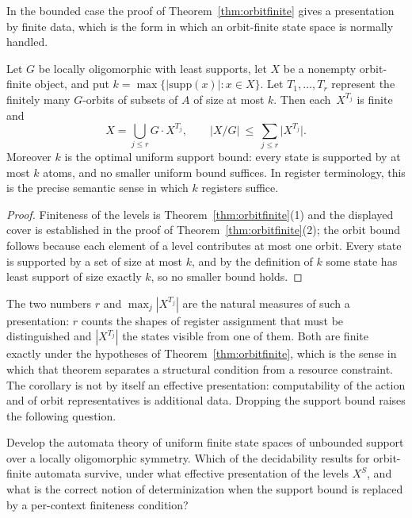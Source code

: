 \documentclass{lmcs}
\newcommand{\supp}{\mathrm{supp}}
\begin{document}
In the bounded case the proof of Theorem~\ref{thm:orbitfinite} gives a
presentation by finite data, which is the form in which an orbit-finite
state space is normally handled.

\begin{cor}\label{cor:presentation}
Let $G$ be locally oligomorphic with least supports, let $X$ be a
nonempty orbit-finite object, and put
$k=\max\{|\supp(x)|:x\in X\}$. Let
$T_1,\dots,T_r$ represent the finitely many $G$-orbits of subsets of
$A$ of size at most $k$. Then each~$X^{T_j}$ is finite and
\[
   X=\bigcup_{j\leq r}G\cdot X^{T_j},
   \qquad
   |X/G|\ \leq\ \sum_{j\leq r}\bigl|X^{T_j}\bigr|.
\]
Moreover $k$ is the optimal uniform support bound: every state is
supported by at most $k$ atoms, and no smaller uniform bound suffices.
In register terminology, this is the precise semantic sense in which
$k$ registers suffice.
\end{cor}

\begin{proof}
Finiteness of the levels is Theorem~\ref{thm:orbitfinite}(1) and the
displayed cover is established in the proof of
Theorem~\ref{thm:orbitfinite}(2); the orbit bound follows because each
element of a level contributes at most one orbit. Every state is
supported by a set of size at most $k$, and by the definition of $k$
some state has least support of size exactly $k$, so no smaller bound
holds.
\end{proof}

The two numbers $r$ and $\max_j|X^{T_j}|$ are the natural measures of
such a presentation: $r$ counts the shapes of register assignment that
must be distinguished and $|X^{T_j}|$ the states visible from one of
them. Both are finite exactly under the hypotheses of
Theorem~\ref{thm:orbitfinite}, which is the sense in which that theorem
separates a structural condition from a resource constraint. The
corollary is not by itself an effective presentation: computability of
the action and of orbit representatives is additional data. Dropping
the support bound raises the following question.

\begin{qu}
\label{q:unifautomata}
Develop the automata theory of uniform finite state spaces of
unbounded support over a locally oligomorphic symmetry. Which of the
decidability results for orbit-finite automata survive, under what
effective presentation of the levels $X^{S}$, and what is the correct
notion of determinization when the support bound is replaced by a
per-context finiteness condition?
\end{qu}
\end{document}
